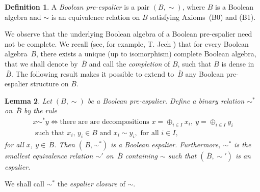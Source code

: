 \documentclass[psamsfonts,reqno]{memo-l}
\theoremstyle{plain}
\newtheorem{lemma}{Lemma}[section]
\theoremstyle{definition}
\newtheorem{definition}[lemma]{Definition}
\theoremstyle{remark}
\numberwithin{equation}{section}
\newcommand{\ol}[1]{\,\overline{\!#1}}
\begin{document}
\begin{definition}\label{D:BpreEsp}
A \emph{Boolean pre-espalier} is a pair
$(B,\sim)$, where $B$ is a Boolean algebra and $\sim$
is an equivalence relation on $B$ satisfying Axioms~(B0) and (B1).
\end{definition}

We observe that the underlying Boolean algebra of a
Boolean pre-espalier need not be complete. We recall (see, for example,
T. Jech \cite{Jech78}) that for every Boolean algebra~$B$,
there exists a unique (up to isomorphism) complete Boolean algebra,
 that we shall denote by
$\ol{B}$ and call the
\emph{completion} of $B$, such that $B$ is dense in~$\ol{B}$.
The following result makes it possible to extend to $\ol{B}$ any
Boolean pre-espalier structure on $B$.

\begin{lemma}\label{L:ExtPreEsp}
Let $(B,\sim)$ be a Boolean pre-espalier.
Define a binary relation $\sim^*$ on
$\ol{B}$ by the rule
   \begin{multline}\label{Eq:Defsim*}
   x\sim^*y\Longleftrightarrow\text{there are are decompositions }
   x=\oplus_{i\in I}x_i,\ y=\oplus_{i\in I}y_i\\
   \text{ such that }
   x_i,\,y_i\in B\text{ and }x_i\sim y_i,\text{ for all }i\in I,
   \end{multline}
%
for all $x$, $y\in\ol{B}$.
Then $(\ol{B},\sim^*)$ is a Boolean espalier.
Furthermore, $\sim^*$ is the smallest equivalence relation $\sim'$ on
$\ol{B}$ containing $\sim$ such that
$(\ol{B},\sim')$ is an espalier.
\end{lemma}

We shall call $\sim^*$ the \emph{espalier closure}
 of $\sim$.
\end{document}
